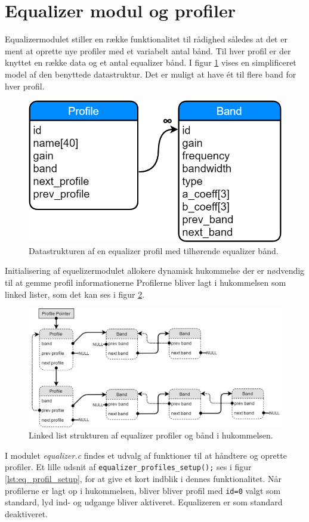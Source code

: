 \section{Equalizer modul og profiler}
Equalizermodulet stiller en række funktionalitet til rådighed således at det er ment at oprette nye profiler med et variabelt antal bånd.
Til hver profil er der knyttet en række data og et antal equalizer bånd.
I figur \ref{fig:eq-profile-db} vises en simplificeret model af den benyttede datastruktur.
Det er muligt at have ét til flere band for hver profil.

\begin{figure}[h!]
	\centering
	\includegraphics[width=.4\textwidth]{billeder/eq_profile_db.png}
	\caption{Datastrukturen af en equalizer profil med tilhørende equalizer bånd.}
	\label{fig:eq-profile-db}
\end{figure}

Initialisering af equelizermodulet allokere dynamisk hukommelse der er nødvendig til at gemme profil informationerne
Profilerne bliver lagt i hukommelsen som linked lister, som det kan ses i figur \ref{fig:eq-profile-linked}.

\begin{figure}[h!]
	\centering
	\includegraphics[width=.9\textwidth]{billeder/eq_linked_profiles.png}
	\caption{Linked list strukturen af equalizer profiler og bånd i hukommelsen.}
	\label{fig:eq-profile-linked}
\end{figure}

I modulet \textit{equalizer.c} findes et udvalg af funktioner til at håndtere og oprette profiler.
Et lille udsnit af \texttt{equalizer\_profiles\_setup();} ses i figur \ref{lst:eq_profil_setup}, for at give et kort indblik i dennes funktionalitet.
Når profilerne er lagt op i hukommelsen, bliver bliver profil med \texttt{id=0} valgt som standard, lyd ind- og udgange bliver aktiveret.
Equalizeren er som standard deaktiveret.

